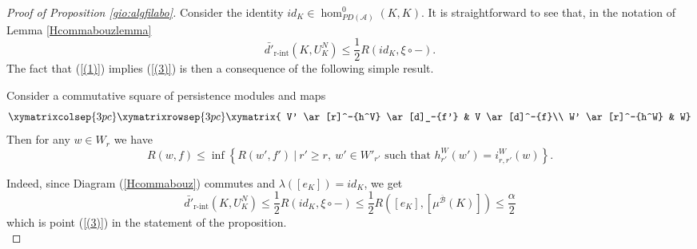 \begin{proof}[Proof of Proposition \ref{gio:algfilabo}]
		Consider the identity $id_K\in \hom_{PD(\mathcal{A})}^0(K,K)$. It is straightforward to see that, in the notation of Lemma \ref{Hcommabouzlemma} $$\bar{d'}_{\text{r-int}}(K,U^N_K)\leq \frac{1}{2}R(id_K,\xi\circ -).$$
		The fact that (\ref{(1)}) implies (\ref{(3)}) is then a consequence of the following simple result.
		\begin{lem}\label{ezlemma}
			Consider a commutative square of persistence modules and maps
			\begin{equation}
				\label{persistencediagram2} \xymatrixcolsep{3pc}
				\xymatrixrowsep{3pc} \xymatrix{ V' \ar[r]^-{h^V}
					\ar[d]_-{f'} & V
					\ar[d]^-{f}\\
					W' \ar[r]^-{h^W} & W}
			\end{equation}
			Then for any $w\in W_r$ we have $$R(w,f)\leq \inf\left\{R(w',f')\ \lvert \ r'\geq  r, \ w'\in W'_{r'} \text{ such that } h^W_{r'}(w')= i^W_{r,r'}(w)\right\}.$$
		\end{lem}
		Indeed, since Diagram (\ref{Hcommabouz}) commutes and $\lambda([e_K])=id_K$, we get $$\bar{d'}_{\text{r-int}}(K,U^N_K)\leq \frac{1}{2} R(id_K,\xi\circ -)\leq \frac{1}{2}R\left([e_K],[\mu^{\overline{\mathcal{B}}}(K)]\right)\leq \frac{\alpha}{2}$$ which is point (\ref{(3)}) in the statement of the proposition.\\
		
		

\end{proof}
